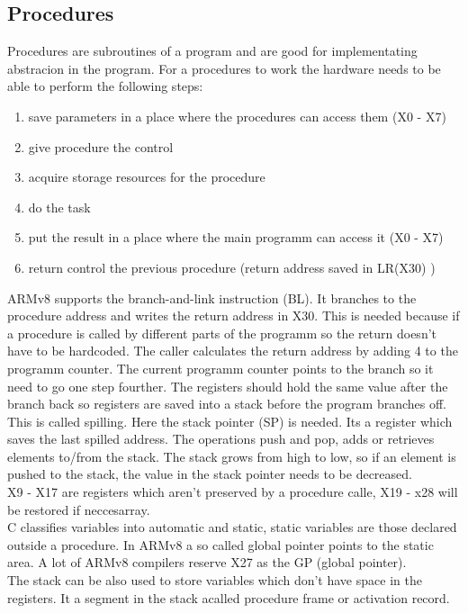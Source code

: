 \documentclass[a4paper]{scrartcl}
\begin{document}
            \subsection{Procedures}
                Procedures are subroutines of a program and are good for implementating abstracion in the program. For a procedures to work the hardware needs to be able to perform the following steps:
                \begin{enumerate}
                    \item save parameters in a place where the procedures can access them (X0 - X7)
                    \item give procedure the control
                    \item acquire storage resources for the procedure
                    \item do the task
                    \item put the result in a place where the main programm can access it (X0 - X7)
                    \item return control the previous procedure (return address saved in LR(X30) ) 
                \end{enumerate}
                ARMv8 supports the branch-and-link instruction (BL). It branches to the procedure address and writes the return address in X30. This is needed because if a procedure
                is called by different parts of the programm so the return doesn't have to be hardcoded.%
                The caller calculates the return address by adding 4 to the programm counter. The current programm counter points to the branch so it need to go one step fourther.
                The registers should hold the same value after the branch back so registers are saved into a stack before the program branches off. This is called spilling. 
                Here the stack pointer (SP) is needed.
                Its a register which saves the last spilled address. The operations push and pop, adds or retrieves elements to/from the stack. The stack grows from high to low, so if an
                element is pushed to the stack, the value in the stack pointer needs to be decreased. \\
                X9 - X17 are registers which aren't preserved by a procedure calle, X19 - x28 will be restored if neccesarray.\\
                C classifies variables into automatic and static, static variables are those declared outside a procedure. In ARMv8 
                a so called global pointer points to the static area. A lot of ARMv8 compilers reserve X27 as the GP (global pointer).\\
                The stack can be also used to store variables which don't have space in the registers. It a segment in the stack acalled procedure frame or activation record.  
\end{document}
